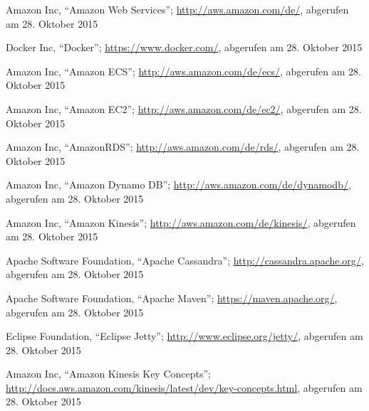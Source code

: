 \begin{thebibliography}{1}

Amazon Inc, ``Amazon Web Services''; \url{http://aws.amazon.com/de/}, abgerufen am 28. Oktober 2015

Docker Inc, ``Docker''; \url{https://www.docker.com/}, abgerufen am 28. Oktober 2015

Amazon Inc, ``Amazon ECS''; \url{http://aws.amazon.com/de/ecs/}, abgerufen am 28. Oktober 2015

Amazon Inc, ``Amazon EC2''; \url{http://aws.amazon.com/de/ec2/}, abgerufen am 28. Oktober 2015

Amazon Inc, ``AmazonRDS''; \url{http://aws.amazon.com/de/rds/}, abgerufen am 28.
Oktober 2015

Amazon Inc, ``Amazon Dynamo DB''; \url{http://aws.amazon.com/de/dynamodb/}, abgerufen am 28. Oktober 2015

Amazon Inc, ``Amazon Kinesis''; \url{http://aws.amazon.com/de/kinesis/}, abgerufen am 28. Oktober 2015

Apache Software Foundation, ``Apache Cassandra''; \url{http://cassandra.apache.org/}, abgerufen am 28. Oktober 2015

Apache Software Foundation, ``Apache Maven''; \url{https://maven.apache.org/}, abgerufen am 28. Oktober 2015

Eclipse Foundation, ``Eclipse Jetty''; \url{http://www.eclipse.org/jetty/}, abgerufen am 28. Oktober 2015

Amazon Inc, ``Amazon Kinesis Key Concepts'';  \url{http://docs.aws.amazon.com/kinesis/latest/dev/key-concepts.html}, abgerufen am 28. Oktober 2015

\end{thebibliography}